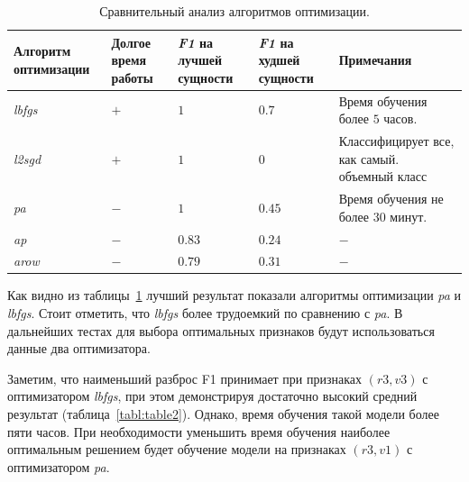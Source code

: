 \documentclass{csmathnotes}
\begin{document}
\begin{table}[!h]
    \begin{center}
        \begin{tabular}{|p{2cm}|p{1.6cm}|p{1.5cm}|p{1.5cm}|p{2.5cm}|}
            \hline
            Алгоритм оптимизации &  Долгое время работы & \emph{F1} на лучшей сущности & \emph{F1} на худшей сущности & Примечания \\
            \hline
            \emph{lbfgs} & $+$ & $1$ & $0.7$ & Время обучения более $5$ часов.  \\
            \hline
            \emph{l2sgd} & $+$ & $1$  & $0$ & Классифицирует все, как самый. объемный класс \\
            \hline
            \emph{pa} & $-$ & $1$  & $0.45$ & Время обучения не более $30$ минут. \\
            \hline
            \emph{ap} & $-$ & $0.83$ & $0.24$  & $-$ \\
            \hline
            \emph{arow} & $-$ & $0.79$ & $0.31$  & $-$ \\
            \hline
        \end{tabular}
    \end{center}
    \caption{\label{tabl:table1}Сравнительный анализ алгоритмов оптимизации.}
\end{table}

Как видно из таблицы~\ref{tabl:table1} лучший результат показали алгоритмы оптимизации \emph{pa} и \emph{lbfgs}. Стоит отметить, что \emph{lbfgs}  более трудоемкий по сравнению с \emph{pa}. В дальнейших тестах для выбора оптимальных признаков будут использоваться данные два оптимизатора.


Заметим, что наименьший разброс F1  принимает при признаках $(r3,v3)$ с оптимизатором \emph{lbfgs}, при этом демонстрируя достаточно высокий средний результат (таблица~\ref{tabl:table2}). Однако, время обучения такой модели более пяти часов. При необходимости уменьшить время обучения наиболее оптимальным решением будет обучение модели на признаках $(r3,v1)$ с оптимизатором \emph{pa}.
\end{document}
